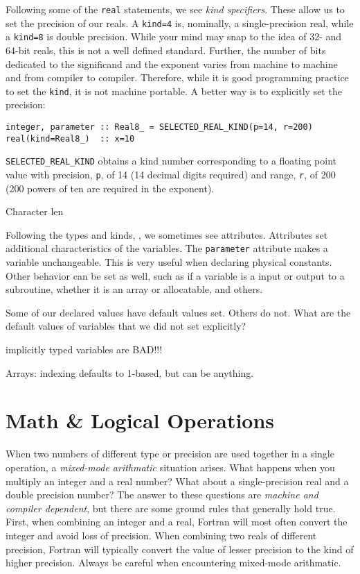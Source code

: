 \documentclass[11pt, letterpaper]{article}
\begin{document}
Following some of the {\tt real} statements, we see \emph{kind specifiers}.
These allow us to set the precision of our reals.  A {\tt kind=4} is,
nominally, a single-precision real, while a {\tt kind=8} is double precision.
While your mind may snap to the idea of 32- and 64-bit reals, this is not
a well defined standard.  Further, the number of bits dedicated to the
significand and the exponent varies from machine to machine and from
compiler to compiler.  Therefore, while it is good programming practice to
set the {\tt kind}, it is not machine portable.  A better way is to explicitly
set the precision:
\begin{verbatim}
integer, parameter :: Real8_ = SELECTED_REAL_KIND(p=14, r=200)
real(kind=Real8_)  :: x=10
\end{verbatim}
{\tt SELECTED\_REAL\_KIND} obtains a kind number corresponding to a floating
point value with precision, {\tt p}, of 14 (14 decimal digits required) and
range, {\tt r}, of 200 (200 powers of ten are required in the exponent).

Character len

Following the types and kinds, , we sometimes see attributes.  Attributes set
additional characteristics of the variables.  The {\tt parameter} attribute
makes a variable unchangeable.  This is very useful when declaring physical
constants.  Other behavior can be set as well, such as if a variable is a input
or output to a subroutine, whether it is an array or allocatable, and others.

Some of our declared values have default values set.  Others do not.  What
are the default values of variables that we did not set explicitly?

implicitly typed variables are BAD!!!

Arrays: indexing defaults to 1-based, but can be anything.

\section{Math \& Logical Operations}

When two numbers of different type or precision are used together in a single
operation, a \emph{mixed-mode arithmatic} situation arises.  What happens when
you multiply an integer and a real number?  What about a single-precision
real and a double precision number?  The answer to these questions are
\emph{machine and compiler dependent}, but there are some ground rules that
generally hold true.  First, when combining an integer and a real, Fortran
will most often convert the integer and avoid loss of precision.  When
combining two reals of different precision, Fortran will typically convert the
value of lesser precision to the kind of higher precision.  Always be
careful when encountering mixed-mode arithmatic.
\end{document}
